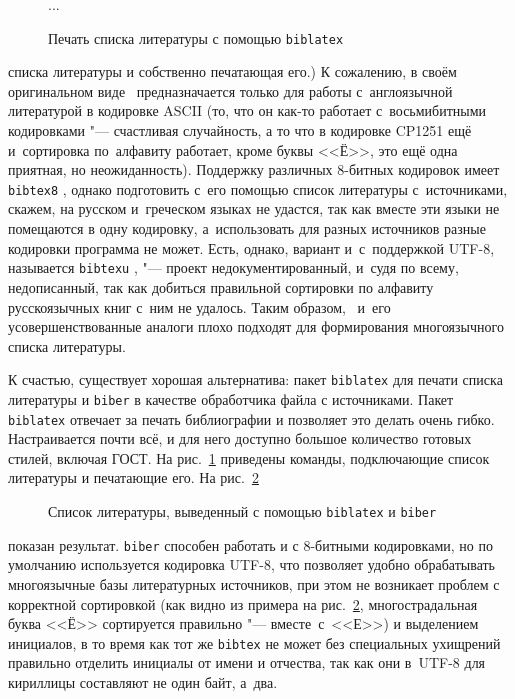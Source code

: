 \documentclass[a4paper,12pt,hyphens]{article}
\newcommand\package[1]{\texttt{#1}}
\newcommand\exe[1]{\texttt{#1}}
\begin{document}
\begin{figure}[tp]
\begin{latexcode}
\usepackage[style=gost-numeric]{biblatex}


...

\printbibliography
\end{latexcode}
\caption{Печать списка литературы с помощью \package{biblatex}}\label{biblatex1}
\end{figure}
списка литературы и собственно печатающая его.)
К сожалению, в своём оригинальном виде \BibTeX\ предназначается только
для работы с~англоязычной литературой в кодировке ASCII (то, что
он как-то работает с~восьмибитными кодировками "--- счастливая случайность,
а то что в кодировке CP1251 ещё и~сортировка по~алфавиту работает,
кроме буквы <<Ё>>, это ещё одна приятная, но неожиданность). Поддержку различных
8-битных кодировок имеет \exe{bibtex8} \parencite{ctan-bibtex8},
однако подготовить с~его помощью
список литературы с~источниками, скажем, на русском и~греческом языках
не удастся, так как вместе эти языки не помещаются в одну кодировку,
а~использовать для разных источников разные кодировки программа не может.
Есть, однако, вариант и~с~поддержкой UTF-8, называется
\exe{bibtexu} \parencite{ctan-bibtexu,se-bibtexu}, "--- проект
недокументированный, и~судя по всему, недописанный, так как
добиться правильной сортировки по алфавиту русскоязычных книг с~ним
не удалось. Таким образом, \BibTeX\ и~его усовершенствованные аналоги
плохо подходят для формирования многоязычного списка литературы.

К счастью, существует хорошая альтернатива: пакет
\package{biblatex} \parencite{ctan-biblatex,se-biblatex}
для печати списка литературы и
\exe{biber} \parencite{ctan-biber}
в качестве обработчика файла с источниками.
Пакет \package{biblatex} отвечает за печать библиографии и позволяет
это делать очень гибко. Настраивается почти всё, и для него доступно большое
количество готовых стилей, включая ГОСТ. На рис.~\ref{biblatex1}
приведены
команды, подключающие список литературы и печатающие его. На рис.~\ref{biblatex2}%
\nocite{esin1950,yolkin1997,chebyshev1859,eliseeva2010}%
%
%
\begin{figure}[tp]
\begin{tcolorbox}[colback=white,colframe=white]
\printbibliography[keyword=example,resetnumbers=1]
\end{tcolorbox}
\caption{Список литературы, выведенный с помощью \package{biblatex} и \exe{biber}}\label{biblatex2}
\end{figure}
показан результат.
\exe{biber} способен работать и с 8-битными кодировками, но по умолчанию
используется кодировка UTF-8, что позволяет удобно обрабатывать многоязычные
базы литературных источников, при этом не возникает проблем с корректной сортировкой
(как видно из примера на рис.~\ref{biblatex2}, многострадальная буква <<Ё>>
сортируется правильно "--- вместе~с~<<Е>>) и выделением инициалов, в то время как
тот же \exe{bibtex} не может без специальных ухищрений правильно отделить
инициалы от имени и отчества, так как они в~UTF-8 для кириллицы составляют не
один байт, а~два.
\end{document}
